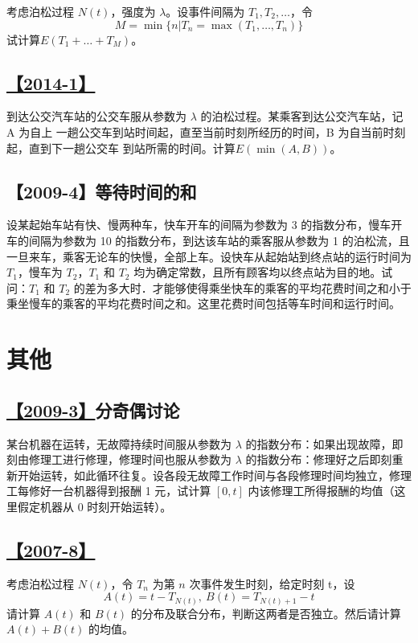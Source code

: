 考虑泊松过程 $N(t)$，强度为 $\lambda$。设事件间隔为 $T_1, T_2, \dots$，令
$$
M=\min\{n|T_n=\max(T_1, \dots, T_n)\}
$$
试计算$E(T_1+\dots+T_M)$。

\subsection{\hyperref[A2014-1]{【2014-1】}}\label{Q2014-1}

到达公交汽车站的公交车服从参数为 $\lambda$ 的泊松过程。某乘客到达公交汽车站，记 A 为自上
一趟公交车到站时间起，直至当前时刻所经历的时间，B 为自当前时刻起，直到下一趟公交车
到站所需的时间。计算$E(\min(A, B))$。

\subsection{【2009-4】等待时间的和}

设某起始车站有快、慢两种车，快车开车的间隔为参数为 3 的指数分布，慢车开车的间隔为参数为 10 的指数分布，到达该车站的乘客服从参数为 1 的泊松流，且一旦来车，乘客无论车的快慢，全部上车。设快车从起始站到终点站的运行时间为 $T_1$，慢车为 $T_2$，$T_1$ 和 $T_2$ 均为确定常数，且所有顾客均以终点站为目的地。试问：$T_1$ 和 $T_2$ 的差为多大时．才能够使得乘坐快车的乘客的平均花费时间之和小于秉坐慢车的乘客的平均花费时间之和。这里花费时间包括等车时间和运行时间。

\section{其他}

\subsection{\hyperref[A2009-3]{【2009-3】}分奇偶讨论}\label{Q2009-3}

某台机器在运转，无故障持续时间服从参数为 $\lambda$ 的指数分布：如果出现故障，即刻由修理工进行修理，修理时间也服从参数为 $\lambda$ 的指数分布：修理好之后即刻重新开始运转，如此循环往复。设各段无故障工作时间与各段修理时间均独立，修理工每修好一台机器得到报酬 1 元，试计算 $[0, t]$ 内该修理工所得报酬的均值（这里假定机器从 0 时刻开始运转）。

\subsection{\hyperref[A2007-8]{【2007-8】}}\label{Q2007-8}

考虑泊松过程 $N(t)$，令 $T_n$ 为第 $n$ 次事件发生时刻，给定时刻 t，设
$$
A(t)=t-T_{N(t)},\ B(t)=T_{N(t)+1}-t
$$
请计算 $A(t)$ 和 $B(t)$ 的分布及联合分布，判断这两者是否独立。然后请计算 $A(t)+B(t)$
的均值。

